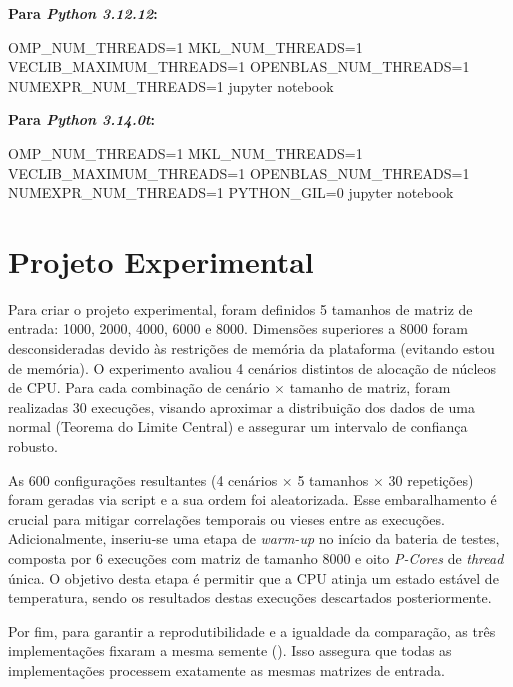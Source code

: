 \documentclass[acmsmall]{acmart}
\begin{document}
\vspace{0.3cm}

\noindent \textbf{Para \textit{Python 3.12.12}:}
\begin{small}
	\noindent OMP\_NUM\_THREADS=1 MKL\_NUM\_THREADS=1 VECLIB\_MAXIMUM\_THREADS=1 OPENBLAS\_NUM\_THREADS=1 NUMEXPR\_NUM\_THREADS=1 jupyter notebook
\end{small}

\vspace{0.3cm}

\noindent \textbf{Para \textit{Python 3.14.0t}:}
\begin{small}
	\noindent OMP\_NUM\_THREADS=1 MKL\_NUM\_THREADS=1 VECLIB\_MAXIMUM\_THREADS=1 OPENBLAS\_NUM\_THREADS=1 NUMEXPR\_NUM\_THREADS=1 PYTHON\_GIL=0 jupyter notebook
\end{small}


\section{Projeto Experimental}
Para criar o projeto experimental, foram definidos 5 tamanhos de matriz de entrada: 1000, 2000, 4000, 6000 e 8000. Dimensões superiores a 8000 foram desconsideradas devido às restrições de memória da plataforma (evitando estou de memória). O experimento avaliou 4 cenários distintos de alocação de núcleos de CPU. Para cada combinação de cenário $\times$ tamanho de matriz, foram realizadas 30 execuções, visando aproximar a distribuição dos dados de uma normal (Teorema do Limite Central) e assegurar um intervalo de confiança robusto. 

As 600 configurações resultantes (4 cenários $\times$ 5 tamanhos $\times$ 30 repetições) foram geradas via script e a sua  ordem foi aleatorizada. Esse embaralhamento é crucial para mitigar correlações temporais ou vieses entre as execuções. Adicionalmente, inseriu-se uma etapa de \textit{warm-up} no início da bateria de testes, composta por 6 execuções com matriz de tamanho 8000 e oito \textit{P-Cores} de \textit{thread} única. O objetivo desta etapa é permitir que a CPU atinja um estado estável de temperatura, sendo os resultados destas execuções descartados posteriormente. 

Por fim, para garantir a reprodutibilidade e a igualdade da comparação, as três implementações fixaram a mesma semente (). Isso assegura que todas as implementações processem exatamente as mesmas matrizes de entrada.
\end{document}
